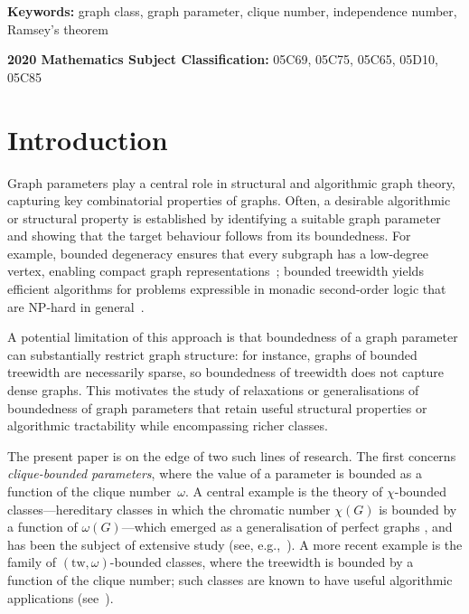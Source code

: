 \documentclass[11pt]{article}
\newcommand{\tw}{\mathrm{tw}}
\theoremstyle{plain}
\theoremstyle{definition}
\theoremstyle{remark}
\numberwithin{equation}{section}
\begin{document}
\noindent\textbf{Keywords:} graph class, graph parameter, clique number, independence number, Ramsey's theorem

\noindent\textbf{2020 Mathematics Subject Classification:} 05C69, 05C75, 05C65, 05D10, 05C85


\section{Introduction}

Graph parameters play a central role in structural and algorithmic graph theory, capturing key combinatorial properties of graphs.
Often, a desirable algorithmic or structural property is established by identifying a suitable graph parameter and showing that the target behaviour follows from its boundedness. For example, bounded degeneracy ensures that every subgraph has a low-degree vertex, enabling compact graph representations~\cite{Spi03}; bounded treewidth yields efficient algorithms for problems expressible in monadic second-order logic that are \textsf{NP}-hard in general~\cite{Cou90}.

A potential limitation of this approach is that boundedness of a graph parameter can substantially restrict graph structure: for instance, graphs of bounded treewidth are necessarily sparse, so boundedness of treewidth does not capture dense graphs. This motivates the study of relaxations or generalisations of boundedness of graph parameters that retain useful structural properties or algorithmic tractability while encompassing richer classes.   

The present paper is on the edge of two such lines of research. 
The first concerns \emph{clique-bounded parameters}, where the value of a parameter is bounded as a function of the clique number~$\omega$. A central example is the theory of $\chi$-bounded classes---hereditary classes in which the chromatic number $\chi(G)$ is bounded by a function of $\omega(G)$---which emerged as a generalisation of perfect graphs \cite{MR0951359}, and has been the subject of extensive study (see, e.g.,~\cite{MR4174126}).
A more recent example is the family of $(\tw,\omega)$-bounded classes, where the treewidth is bounded by a function of the clique number; such classes are known to have useful algorithmic applications (see~\cite{MR4334541,MR4332111}).
\end{document}
